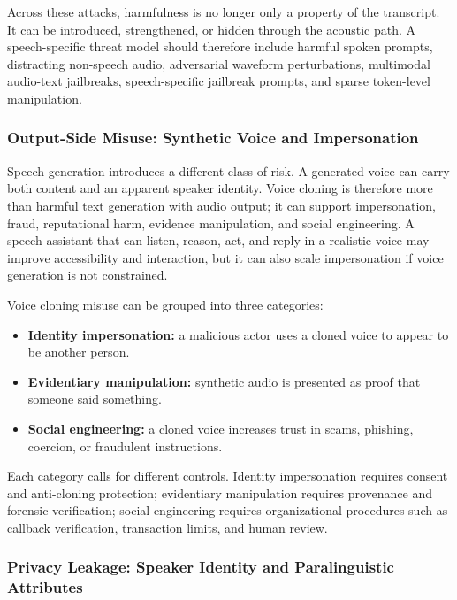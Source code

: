 Across these attacks, harmfulness is no longer only a property of the transcript. It can be introduced, strengthened, or hidden through the acoustic path. A speech-specific threat model should therefore include harmful spoken prompts, distracting non-speech audio, adversarial waveform perturbations, multimodal audio-text jailbreaks, speech-specific jailbreak prompts, and sparse token-level manipulation.

\subsubsection{Output-Side Misuse: Synthetic Voice and Impersonation}

Speech generation introduces a different class of risk. A generated voice can carry both content and an apparent speaker identity. Voice cloning is therefore more than harmful text generation with audio output; it can support impersonation, fraud, reputational harm, evidence manipulation, and social engineering. A speech assistant that can listen, reason, act, and reply in a realistic voice may improve accessibility and interaction, but it can also scale impersonation if voice generation is not constrained.

Voice cloning misuse can be grouped into three categories:

\begin{itemize}
\item \textbf{Identity impersonation:} a malicious actor uses a cloned voice to appear to be another person.
\item \textbf{Evidentiary manipulation:} synthetic audio is presented as proof that someone said something.
\item \textbf{Social engineering:} a cloned voice increases trust in scams, phishing, coercion, or fraudulent instructions.
\end{itemize}

Each category calls for different controls. Identity impersonation requires consent and anti-cloning protection; evidentiary manipulation requires provenance and forensic verification; social engineering requires organizational procedures such as callback verification, transaction limits, and human review.

\subsubsection{Privacy Leakage: Speaker Identity and Paralinguistic Attributes}

